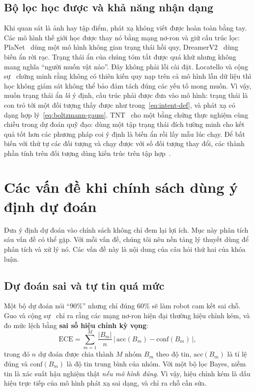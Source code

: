 \subsection{Bộ lọc học được và khả năng nhận dạng}

Khi quan sát là ảnh hay tập điểm, phát xạ không viết được hoàn toàn bằng tay. Các mô hình thế giới học được thay nó bằng mạng nơ-ron và giữ cấu trúc lọc: PlaNet~\cite{hafner2019planet} dùng một mô hình không gian trạng thái hồi quy, DreamerV2~\cite{hafner2021dreamerv2} dùng biến ẩn rời rạc. Trạng thái ẩn của chúng tóm tắt được quá khứ nhưng không mang nghĩa ``người muốn vật nào''. Đây không phải lỗi cài đặt. Locatello và cộng sự~\cite{locatello2019challenging} chứng minh rằng không có thiên kiến quy nạp trên cả mô hình lẫn dữ liệu thì học không giám sát không thể bảo đảm tách đúng các yếu tố mong muốn. Vì vậy, muốn trạng thái ẩn \emph{là} ý định, cấu trúc phải được đưa vào mô hình: trạng thái là con trỏ tới một đối tượng thấy được như trong~\eqref{eq:intent-def}, và phát xạ có dạng hợp lý~\eqref{eq:boltzmann-gauss}. TNT~\cite{zhao2020tnt} cho một bằng chứng thực nghiệm cùng chiều trong dự đoán quỹ đạo: dùng một tập trạng thái đích tường minh cho kết quả tốt hơn các phương pháp coi ý định là biến ẩn rồi lấy mẫu lúc chạy. Để bất biến với thứ tự các đối tượng và chạy được với số đối tượng thay đổi, các thành phần tính trên đối tượng dùng kiến trúc trên tập hợp~\cite{zaheer2017deepsets}.

\section{Các vấn đề khi chính sách dùng ý định dự đoán}
\label{sec:bg-problems}

Đưa ý định dự đoán vào chính sách không chỉ đem lại lợi ích. Mục này phân tích sáu vấn đề có thể gặp. Với mỗi vấn đề, chúng tôi nêu nền tảng lý thuyết dùng để phân tích và xử lý nó. Các vấn đề này là nội dung của câu hỏi thứ hai của khóa luận.

\subsection{Dự đoán sai và tự tin quá mức}

Một bộ dự đoán nói ``90\%'' nhưng chỉ đúng 60\% sẽ làm robot cam kết sai chỗ. Guo và cộng sự~\cite{guo2017calibration} chỉ ra rằng các mạng nơ-ron hiện đại thường hiệu chỉnh kém, và đo mức lệch bằng \textbf{sai số hiệu chỉnh kỳ vọng}:
\begin{equation}
  \mathrm{ECE}=\sum_{m=1}^{M}\frac{|B_m|}{n}\,\big|\,\mathrm{acc}(B_m)-\mathrm{conf}(B_m)\,\big|,
  \label{eq:ece}
\end{equation}
trong đó $n$ dự đoán được chia thành $M$ nhóm $B_m$ theo độ tin, $\mathrm{acc}(B_m)$ là tỉ lệ đúng và $\mathrm{conf}(B_m)$ là độ tin trung bình của nhóm. Với một bộ lọc Bayes, niềm tin là xác suất hậu nghiệm thật \emph{nếu mô hình đúng}. Vì vậy, hiệu chỉnh kém là dấu hiệu trực tiếp của mô hình phát xạ sai dạng, và chỉ ra chỗ cần sửa.

